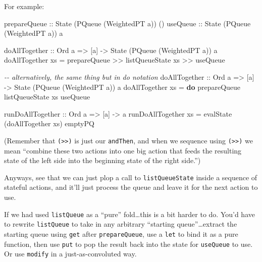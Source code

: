 \documentclass[]{article}
\newenvironment{Shaded}{}{}
\newcommand{\CommentTok}[1]{\textcolor[rgb]{0.38,0.63,0.69}{\textit{#1}}}
\newcommand{\DataTypeTok}[1]{\textcolor[rgb]{0.56,0.13,0.00}{#1}}
\newcommand{\KeywordTok}[1]{\textcolor[rgb]{0.00,0.44,0.13}{\textbf{#1}}}
\newcommand{\NormalTok}[1]{#1}
\newcommand{\OperatorTok}[1]{\textcolor[rgb]{0.40,0.40,0.40}{#1}}
\newcommand{\OtherTok}[1]{\textcolor[rgb]{0.00,0.44,0.13}{#1}}
\begin{document}
For example:

\begin{Shaded}
\begin{Highlighting}[]
\OtherTok{prepareQueue ::} \DataTypeTok{State}\NormalTok{ (}\DataTypeTok{PQueue}\NormalTok{ (}\DataTypeTok{WeightedPT}\NormalTok{ a)) ()}
\OtherTok{useQueue     ::} \DataTypeTok{State}\NormalTok{ (}\DataTypeTok{PQueue}\NormalTok{ (}\DataTypeTok{WeightedPT}\NormalTok{ a)) a}

\OtherTok{doAllTogether ::} \DataTypeTok{Ord}\NormalTok{ a }\OtherTok{=\textgreater{}}\NormalTok{ [a] }\OtherTok{{-}\textgreater{}} \DataTypeTok{State}\NormalTok{ (}\DataTypeTok{PQueue}\NormalTok{ (}\DataTypeTok{WeightedPT}\NormalTok{ a)) a}
\NormalTok{doAllTogether xs }\OtherTok{=}\NormalTok{ prepareQueue }\OperatorTok{\textgreater{}\textgreater{}}\NormalTok{ listQueueState xs }\OperatorTok{\textgreater{}\textgreater{}}\NormalTok{ useQueue}

\CommentTok{{-}{-} alternatively, the same thing but in do notation}
\OtherTok{doAllTogether\textquotesingle{} ::} \DataTypeTok{Ord}\NormalTok{ a }\OtherTok{=\textgreater{}}\NormalTok{ [a] }\OtherTok{{-}\textgreater{}} \DataTypeTok{State}\NormalTok{ (}\DataTypeTok{PQueue}\NormalTok{ (}\DataTypeTok{WeightedPT}\NormalTok{ a)) a}
\NormalTok{doAllTogether\textquotesingle{} xs }\OtherTok{=} \KeywordTok{do}
\NormalTok{    prepareQueue}
\NormalTok{    listQueueState xs}
\NormalTok{    useQueue}

\OtherTok{runDoAllTogether ::} \DataTypeTok{Ord}\NormalTok{ a }\OtherTok{=\textgreater{}}\NormalTok{ [a] }\OtherTok{{-}\textgreater{}}\NormalTok{ a}
\NormalTok{runDoAllTogether xs }\OtherTok{=}\NormalTok{ evalState (doAllTogether xs) emptyPQ}
\end{Highlighting}
\end{Shaded}

(Remember that \texttt{(\textgreater{}\textgreater{})} is just our
\texttt{andThen}, and when we sequence using
\texttt{(\textgreater{}\textgreater{})} we mean ``combine these two actions into
one big action that feeds the resulting state of the left side into the
beginning state of the right side.'')

Anyways, see that we can just plop a call to \texttt{listQueueState} inside a
sequence of stateful actions, and it'll just process the queue and leave it for
the next action to use.

If we had used \texttt{listQueue} as a ``pure'' fold\ldots this is a bit harder
to do. You'd have to rewrite \texttt{listQueue} to take in any arbitrary
``starting queue''\ldots extract the starting queue using \texttt{get} after
\texttt{prepareQueue}, use a \texttt{let} to bind it as a pure function, then
use \texttt{put} to pop the result back into the state for \texttt{useQueue} to
use. Or use \texttt{modify} in a just-as-convoluted way.
\end{document}
